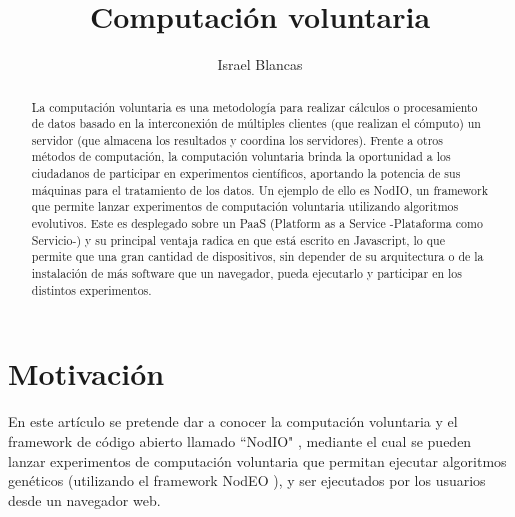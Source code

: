 \documentclass[runningheads,a4paper]{llncs}
\begin{document}
\mainmatter  %

\title{Computaci\'on voluntaria}


%
\author{Israel Blancas }
%


\maketitle


\begin{abstract}
La computaci\'on voluntaria es una metodolog\'ia para realizar c\'alculos o procesamiento
de datos basado en la interconexi\'on de m\'ultiples clientes (que realizan el c\'omputo)
un servidor (que almacena los resultados y coordina los servidores). Frente a otros m\'etodos
de computaci\'on, la computaci\'on voluntaria brinda la oportunidad a los ciudadanos
de participar en experimentos cient\'ificos, aportando la potencia de sus m\'aquinas
para el tratamiento de los datos. Un ejemplo de ello es NodIO, un framework
que permite lanzar experimentos de computaci\'on voluntaria utilizando algoritmos
evolutivos. Este es desplegado sobre un PaaS (Platform as a Service -Plataforma como Servicio-)
y su principal ventaja radica en que est\'a escrito en Javascript, lo que permite
que una gran cantidad de dispositivos, sin depender de su arquitectura o de la
instalaci\'on de m\'as software que un navegador, pueda ejecutarlo y participar
en los distintos experimentos.
\end{abstract}


\section{Motivaci\'on}
En este art\'iculo se pretende dar a conocer la computaci\'on voluntaria y
el framework de c\'odigo abierto llamado ``NodIO" \cite{nodio}, mediante el cual
se pueden lanzar experimentos de computaci\'on voluntaria
que permitan ejecutar algoritmos gen\'eticos (utilizando el framework NodEO \cite{nodeo}),
y ser ejecutados por los usuarios desde un navegador web.
\end{document}
